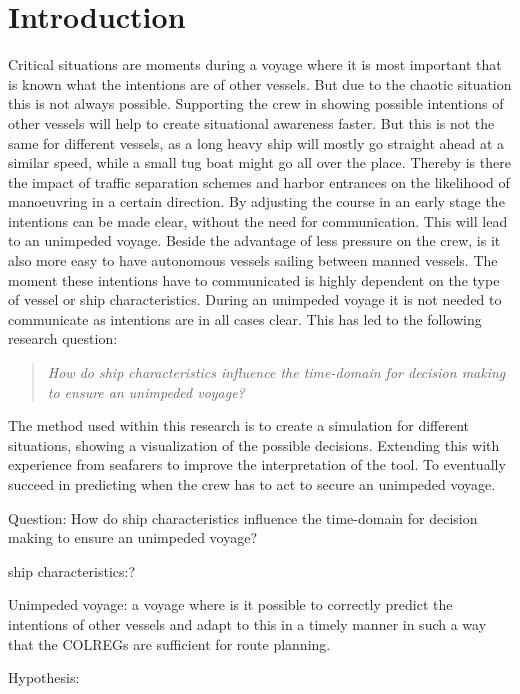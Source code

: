 \chapter*{Introduction}
Critical situations are moments during a voyage where it is most important that is known what the intentions are of other vessels. But due to the chaotic situation this is not always possible. Supporting the crew in showing possible intentions of other vessels will help to create situational awareness faster. 
But this is not the same for different vessels, as a long heavy ship will mostly go straight ahead at a similar speed, while a small tug boat might go all over the place. Thereby is there the impact of traffic separation schemes and harbor entrances on the likelihood of manoeuvring in a certain direction. 
By adjusting the course in an early stage the intentions can be made clear, without the need for communication. This will lead to an unimpeded voyage. Beside the advantage of less pressure on the crew, is it also more easy to have autonomous vessels sailing between manned vessels.
The moment these intentions have to communicated is highly dependent on the type of vessel or ship characteristics. During an unimpeded voyage it is not needed to communicate as intentions are in all cases clear. This has led to the following research question:

\begin{quotation}
	\emph{How do ship characteristics influence the time-domain for decision making to ensure an unimpeded voyage?} 
\end{quotation}

The method used within this research is to create a simulation for different situations, showing a visualization of the possible decisions. Extending this with experience from seafarers to improve the interpretation of the tool. To eventually succeed in predicting when the crew has to act to secure an unimpeded voyage.




Question: How do ship characteristics influence the time-domain for decision making to ensure an unimpeded voyage? 

ship characteristics:?

Unimpeded voyage: a voyage where is it possible to correctly predict the intentions of other vessels and adapt to this in a timely manner in such a way that the COLREGs are sufficient for route planning.



Hypothesis: